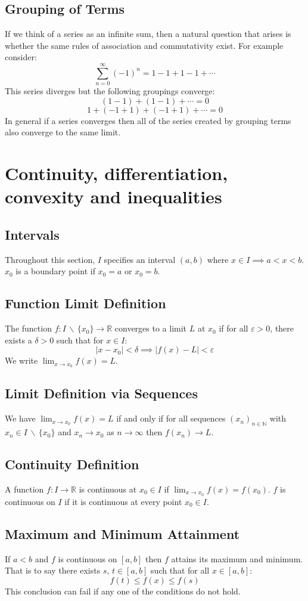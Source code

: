 \documentclass[12pt]{article}
\newcommand{\seq}[2]{(#1_#2)_{#2\in\mathbb{N}}}
\begin{document}
\subsection{Grouping of Terms}
If we think of a series as an infinite sum, then a natural question that arises is whether the same rules of association and commutativity exist. For example consider:
\[\sum^\infty_{n=0}(-1)^n=1-1+1-1+\cdots\]
This series diverges but the following groupings converge:
\[(1-1)+(1-1)+\cdots =0\]
\[1+(-1+1)+(-1+1)+\cdots=0\]
In general if a series converges then all of the series created by grouping terms also converge to the same limit.
\clearpage
\section{Continuity, differentiation, convexity and inequalities}
\subsection{Intervals}
Throughout this section, \(I\) specifies an interval \((a,b)\) where \(x\in I\implies a<x<b\). \(x_0\) is a boundary point if \(x_0=a\) or \(x_0=b\).
\subsection{Function Limit Definition}
The function \(f:I\,\backslash\,\{x_0\}\to\mathbb{R}\) converges to a limit \(L\) at \(x_0\) if for all \(\varepsilon>0\), there exists a \(\delta>0\) such that for \(x\in I\):
\[|x-x_0|<\delta\implies |f(x)-L|<\varepsilon\]
We write \(\lim_{x\to x_0}f(x)=L\).
\subsection{Limit Definition via Sequences}
We have \(\lim_{x\to x_0}f(x)=L\) if and only if for all sequences \(\seq{x}{n}\) with \(x_n\in I\,\backslash\,\{x_0\}\) and \(x_n\to x_0\) as \(n\to \infty\) then \(f(x_n)\to L\).
\subsection{Continuity Definition}
A function \(f:I\to\mathbb{R}\) is continuous at \(x_0\in I\) if \(\lim_{x\to x_0}f(x)=f(x_0)\). \(f\) is continuous on \(I\) if it is continuous at every point \(x_0\in I\).
\subsection{Maximum and Minimum Attainment}
If \(a<b\) and \(f\) is continuous on \([a,b]\) then \(f\) attains its maximum and minimum. That is to say there exists \(s,\,t\in [a,b]\) such that for all \(x\in [a,b]\):
\[f(t)\leq f(x)\leq f(s)\]
This conclusion can fail if any one of the conditions do not hold.
\end{document}
